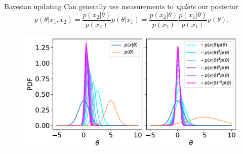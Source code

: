 \documentclass[
aspectratio=169,
14pt,
professionalfonts
]{beamer}
\begin{document}
\begin{frame}{Bayesian updating}
        \vspace{-0.5cm}
        Can generally use measurements to \textit{update} our posterior
        $$
        p(\theta | x_1, x_2) = \frac{p(x_2|\theta)}{p(x_2)} p(\theta | x_1) = \frac{p(x_2|\theta)}{p(x_2)} \frac{p(x_1|\theta)}{p(x_1)} p(\theta).
        $$
        \begin{figure}
            \centering
            \includegraphics[width=0.65\linewidth]{../plots/updating.pdf}
        \end{figure}

\end{frame}
\end{document}
